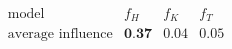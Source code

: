\[\begin{array}{c|ccc}
      \text{model}             & f_H           & f_K  & f_T  \\\hline
      \text{average influence} & \textbf{0.37} & 0.04 & 0.05
\end{array}\]